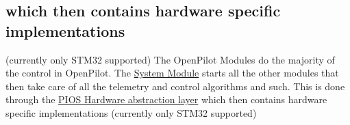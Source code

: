 \subsection*{which then contains hardware specific implementations}

(currently only S\-T\-M32 supported) The Open\-Pilot Modules do the majority of the control in Open\-Pilot. The \hyperlink{group___system_module}{System Module} starts all the other modules that then take care of all the telemetry and control algorithms and such. This is done through the \hyperlink{group___p_i_o_s}{P\-I\-O\-S Hardware abstraction layer} which then contains hardware specific implementations (currently only S\-T\-M32 supported)